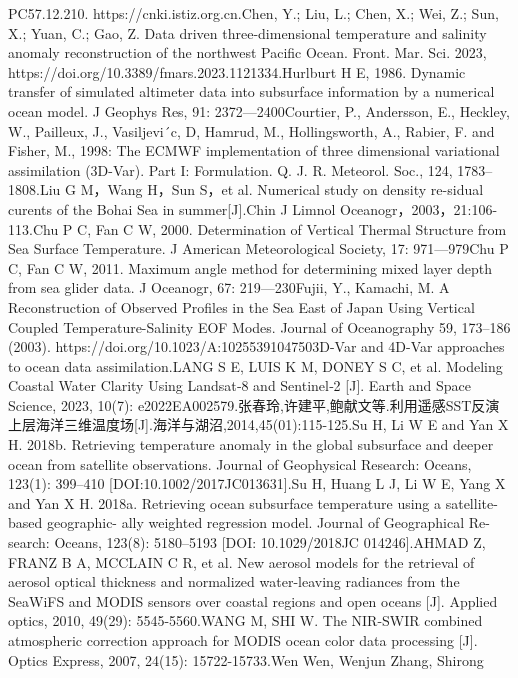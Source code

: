 \documentclass[
  12pt,
]{article}
\begin{document}
PC57.12.210. https://cnki.istiz.org.cn.Chen, Y.; Liu, L.; Chen, X.; Wei,
Z.; Sun, X.; Yuan, C.; Gao, Z. Data driven three-dimensional temperature
and salinity anomaly reconstruction of the northwest Pacific Ocean.
Front. Mar. Sci. 2023,
https://doi.org/10.3389/fmars.2023.1121334.Hurlburt H E, 1986. Dynamic
transfer of simulated altimeter data into subsurface information by a
numerical ocean model. J Geophys Res, 91: 2372---2400Courtier, P.,
Andersson, E., Heckley, W., Pailleux, J., Vasiljevi´c, D, Hamrud, M.,
Hollingsworth, A., Rabier, F. and Fisher, M., 1998: The ECMWF
implementation of three dimensional variational assimilation (3D-Var).
Part I: Formulation. Q. J. R. Meteorol. Soc., 124, 1783--1808.Liu G
M，Wang H，Sun S，et al. Numerical study on density re-sidual curents of
the Bohai Sea in summer{[}J{]}.Chin J Limnol
Oceanogr，2003，21:106-113.Chu P C, Fan C W, 2000. Determination of
Vertical Thermal Structure from Sea Surface Temperature. J American
Meteorological Society, 17: 971---979Chu P C, Fan C W, 2011. Maximum
angle method for determining mixed layer depth from sea glider data. J
Oceanogr, 67: 219---230Fujii, Y., Kamachi, M. A Reconstruction of
Observed Profiles in the Sea East of Japan Using Vertical Coupled
Temperature-Salinity EOF Modes. Journal of Oceanography 59, 173--186
(2003). https://doi.org/10.1023/A:10255391047503D-Var and 4D-Var
approaches to ocean data assimilation.LANG S E, LUIS K M, DONEY S C, et
al. Modeling Coastal Water Clarity Using Landsat‐8 and Sentinel‐2
{[}J{]}. Earth and Space Science, 2023, 10(7):
e2022EA002579.张春玲,许建平,鲍献文等.利用遥感SST反演上层海洋三维温度场{[}J{]}.海洋与湖沼,2014,45(01):115-125.Su
H, Li W E and Yan X H. 2018b. Retrieving temperature anomaly in the
global subsurface and deeper ocean from satellite observations. Journal
of Geophysical Research: Oceans, 123(1): 399--410
{[}DOI:10.1002/2017JC013631{]}.Su H, Huang L J, Li W E, Yang X and Yan X
H. 2018a. Retrieving ocean subsurface temperature using a
satellite-based geographic- ally weighted regression model. Journal of
Geographical Re- search: Oceans, 123(8): 5180--5193 {[}DOI:
10.1029/2018JC 014246{]}.AHMAD Z, FRANZ B A, MCCLAIN C R, et al. New
aerosol models for the retrieval of aerosol optical thickness and
normalized water-leaving radiances from the SeaWiFS and MODIS sensors
over coastal regions and open oceans {[}J{]}. Applied optics, 2010,
49(29): 5545-5560.WANG M, SHI W. The NIR-SWIR combined atmospheric
correction approach for MODIS ocean color data processing {[}J{]}.
Optics Express, 2007, 24(15): 15722-15733.Wen Wen, Wenjun Zhang, Shirong
\end{document}
